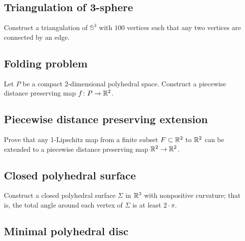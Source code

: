 \subsection*{Triangulation of 3-sphere}\label{4-poly}

\begin{pr}
Construct a triangulation of $\mathbb{S}^3$ 
with $100$ vertices
such that any two vertices are connected by an edge.
\end{pr}

\subsection*{Folding problem}\label{Folding problem}

\begin{pr}
Let $P$ be a compact $2$-dimensional 
polyhedral space. 
Construct a 
piecewise distance preserving map
$f\colon P\to \mathbb{R}^2$.
\end{pr}

\subsection*{Piecewise distance preserving extension}\label{iso-kirzhbraun}

\begin{pr}
Prove that any 1-Lipschitz map from a finite subset $F\subset \mathbb{R}^2$
to 
$\mathbb{R}^2$ can be extended to a 
piecewise distance preserving map
$\mathbb{R}^2\to\mathbb{R}^2$.
\end{pr}

\subsection*{Closed polyhedral surface}\label{Closed polyhedral surface}

\begin{pr}
Construct a closed polyhedral surface $\Sigma$ in $\mathbb{R}^3$ with nonpositive curvature;
that is, the total angle around each vertex of $\Sigma$ is at least $2\cdot\pi$.
\end{pr}

\subsection*{Minimal polyhedral disc}\label{Minimal polyhedral disc}

